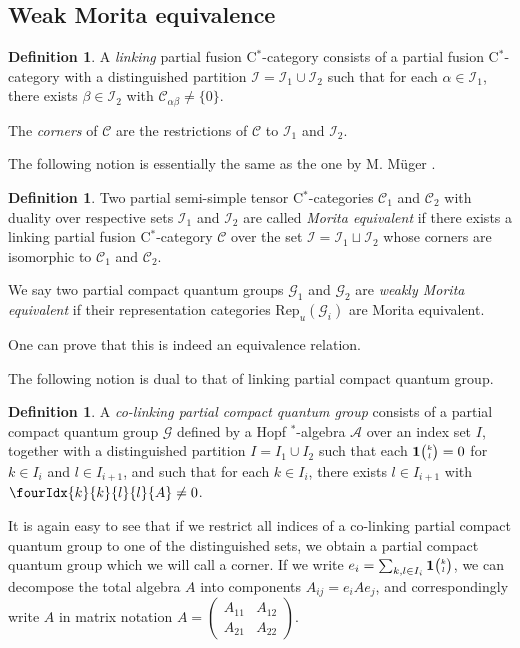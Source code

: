 \documentclass[10pt]{article}
\newcommand{\CatC}{\mathcal{C}}
\newcommand{\CatCC}{\mathscr{C}}
\newcommand{\Rep}{\mathrm{Rep}}
\newcommand{\Grt}[3]{#1{\tiny {\begin{pmatrix} #2\\#3\end{pmatrix}}}}
\newcommand{\UnitC}[2]{\Grt{\mathbf{1}}{#1}{#2}}
\newcommand{\Gr}[5]{\fourIdx{#2}{#4}{#3}{#5}{#1}}%
\theoremstyle{definition}
\newtheorem{Def}[Theorem]{Definition}
\numberwithin{equation}{section}
\begin{document}
\subsection{Weak Morita equivalence}

\begin{Def} A \emph{linking} partial fusion C$^*$-category consists of a partial fusion C$^*$-category with a distinguished partition $\mathscr{I} =\mathscr{I}_1 \cup \mathscr{I}_2$ such that for each $\alpha\in \mathscr{I}_1$, there exists $\beta \in \mathscr{I}_{2}$ with $\CatC_{\alpha\beta}\neq \{0\}$.

The \emph{corners} of $\CatCC$ are the restrictions of $\CatCC$ to $\mathscr{I}_1$ and $\mathscr{I}_2$.
\end{Def}

The following notion is essentially the same as the one by M. M\"{u}ger \cite{Mug1}. 

\begin{Def} Two partial semi-simple tensor C$^*$-categories $\CatCC_1$ and $\CatCC_2$ with duality over respective sets $\mathscr{I}_1$ and $\mathscr{I}_2$ are called \emph{Morita equivalent} if there exists a linking partial fusion C$^*$-category $\CatCC$ over the set $\mathscr{I}=\mathscr{I}_1\sqcup \mathscr{I}_2$ whose corners are isomorphic to $\CatCC_1$ and $\CatCC_2$.

We say two partial compact quantum groups $\mathscr{G}_1$ and $\mathscr{G}_2$ are \emph{weakly Morita equivalent} if their representation categories $\Rep_u(\mathscr{G}_i)$ are Morita equivalent. 
\end{Def} 

One can prove that this is indeed an equivalence relation. 

The following notion is dual to that of linking partial compact quantum group.

\begin{Def}\label{DefCoLink} A \emph{co-linking partial compact quantum group} consists of a partial compact quantum group $\mathscr{G}$ defined by a Hopf $^*$-algebra $\mathscr{A}$ over an index set $I$, together with a distinguished partition $I = I_1\cup I_2$ such that each $\UnitC{k}{l}=0$ for $k\in I_i$ and $l\in I_{i+1}$, and such that for each $k\in I_i$, there exists $l\in I_{i+1}$ with $\Gr{A}{k}{l}{k}{l}\neq 0$.  
\end{Def} 

It is again easy to see that if we restrict all indices of a co-linking partial compact quantum group to one of the distinguished sets, we obtain a partial compact quantum group which we will call a corner. If we write $e_i = \sum_{k,l\in I_i} \UnitC{k}{l}$, we can decompose the total algebra $A$ into components $A_{ij} = e_{i}Ae_{j}$, and correspondingly write $A$ in matrix notation $A = \begin{pmatrix} A_{11} & A_{12}  \\ A_{21} & A_{22}\end{pmatrix}$.
\end{document}
